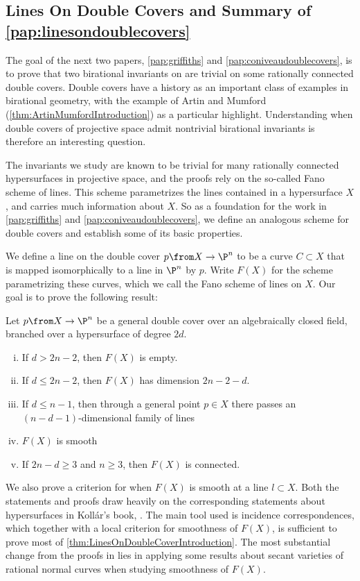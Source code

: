 \subsection{Lines On Double Covers and Summary of \cref{pap:linesondoublecovers}}
The goal of the next two papers, \cref{pap:griffiths} and \cref{pap:coniveaudoublecovers}, is to prove that two birational invariants on are trivial on some rationally connected double covers. Double covers have a history as an important class of examples in birational geometry, with the example of Artin and Mumford (\cref{thm:ArtinMumfordIntroduction}) as a particular highlight. Understanding when double covers of projective space admit nontrivial birational invariants is therefore an interesting question.

The invariants we study are known to be trivial for many rationally connected  hypersurfaces in projective space, and the proofs rely on the so-called Fano scheme of lines. This scheme parametrizes the lines contained in a hypersurface $X$, and carries much information about $X$. So as a foundation for the work in \cref{pap:griffiths} and \cref{pap:coniveaudoublecovers}, we define an analogous scheme for double covers and establish some of its basic properties.

We define a line on the double cover $p \from X \to \P^n$ to be a curve $C \subset X$ that is mapped isomorphically to a line in $\P^n$ by $p$. Write $F(X)$ for the scheme parametrizing these curves, which we call the Fano scheme of lines on $X$. Our goal is to prove the following result:
\begin{theorem}
	\label{thm:LinesOnDoubleCoverIntroduction}
	Let $p \from X \to \P^n$ be a general double cover over an algebraically closed field, branched over a hypersurface of degree $2d$.
	\begin{enumerate}[i)]
		\item If $d > 2n - 2$, then $F(X)$ is empty.
		\item If $d \leq 2n - 2$, then $F(X)$ has dimension $2n-2-d$.
		\item If $d \leq n-1$, then through a general point $p \in X$ there passes an $(n-d-1)$-dimensional family of lines
		\item $F(X)$ is smooth
		\item If $2n-d \geq 3$ and $n \geq 3$, then $F(X)$ is connected.
	\end{enumerate}
\end{theorem}
We also prove a criterion for when $F(X)$ is smooth at a line $l \subset X$. Both the statements and proofs draw heavily on the corresponding statements about hypersurfaces in Koll\'ar's book, \cite[Section V.4]{KollarRationalCurves}. The main tool used is incidence correspondences, which together with a local criterion for smoothness of $F(X)$, is sufficient to prove most of \cref{thm:LinesOnDoubleCoverIntroduction}. The most substantial change from the proofs in \cite[Section V.4]{KollarRationalCurves} lies in applying some results about secant varieties of rational normal curves when studying smoothness of $F(X)$.


